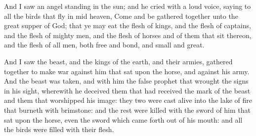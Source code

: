  And I saw an angel standing in the sun; and he cried with a loud voice, saying to all the birds that fly in mid heaven, Come and be gathered together unto the great supper of God; 
 that ye may eat the flesh of kings, and the flesh of captains, and the flesh of mighty men, and the flesh of horses and of them that sit thereon, and the flesh of all men, both free and bond, and small and great.

 And I saw the beast, and the kings of the earth, and their armies, gathered together to make war against him that sat upon the horse, and against his army. 
 And the beast was taken, and with him the false prophet that wrought the signs in his sight, wherewith he deceived them that had received the mark of the beast and them that worshipped his image: they two were cast alive into the lake of fire that burneth with brimstone: 
 and the rest were killed with the sword of him that sat upon the horse, even the sword which came forth out of his mouth: and all the birds were filled with their flesh.